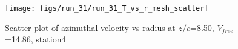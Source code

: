 \begin{figure}[H]
\centering
\texttt{[image: figs/run\_31/run\_31\_T\_vs\_r\_mesh\_scatter]}
\caption{Scatter plot of azimuthal velocity vs radius at $z/c$=8.50, $V_{free}$=14.86, station4}
\label{fig:run_31_T_vs_r_mesh_scatter}
\end{figure}


